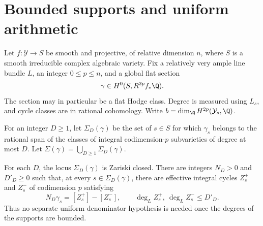 \section{Bounded supports and uniform arithmetic}

Let \(f:\mathcal Y\to S\) be smooth and projective, of relative
dimension \(n\), where \(S\) is a smooth irreducible complex algebraic
variety. Fix a relatively very ample line bundle \(L\), an integer
\(0\le p\le n\), and a global flat section
\[
 \gamma\in H^0(S,R^{2p}f_*\Q).
\]
The section may in particular be a flat Hodge class. Degree is measured
using \(L_s\), and cycle classes are in rational cohomology.
Write \(b=\dim_\Q H^{2p}(\mathcal Y_s,\Q)\).

\begin{definition}
For an integer \(D\ge1\), let \(\Sigma_D(\gamma)\) be the set of \(s\in S\) for
which \(\gamma_s\) belongs to the rational span of the classes of
integral codimension-\(p\) subvarieties of degree at most \(D\).
Let \(\Sigma(\gamma)=\bigcup_{D\ge1}\Sigma_D(\gamma)\).
\end{definition}

\begin{theorem}
\label{v7:new:thm:degree-closed}
For each \(D\), the locus \(\Sigma_D(\gamma)\) is Zariski closed.
There are integers \(N_D>0\) and \(D'_D\ge0\) such that, at every
\(s\in\Sigma_D(\gamma)\), there are effective integral cycles
\(Z_s^+\) and \(Z_s^-\) of codimension \(p\) satisfying
\[
 N_D\gamma_s=[Z_s^+]-[Z_s^-],\qquad
 \deg_L Z_s^+,\ \deg_L Z_s^-\le D'_D.
\]
Thus no separate uniform denominator hypothesis is needed once the
degrees of the supports are bounded.
\end{theorem}

